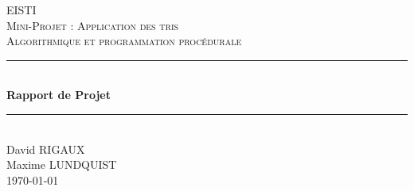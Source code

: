 \documentclass[12pt]{article}
\begin{document}
\lstset{language=Pascal} 
\begin{titlepage}

\newcommand{\HRule}{\rule{\linewidth}{0.5mm}} %

\center %
 

\textsc{\LARGE EISTI}\\[1.5cm] %
\textsc{\Large Mini-Projet : Application des tris}\\[0.5cm] %
\textsc{\large Algorithmique et programmation procédurale}\\[0.5cm] %


\HRule \\[0.4cm]
{ \huge \bfseries  Rapport de Projet}\\[0.4cm] %
\HRule \\[1cm]
 

\Large
David \textsc{RIGAUX}\\[0.5cm]
Maxime \textsc{LUNDQUIST}\\[1cm]


{\large \today}\\[1cm] %



\end{titlepage}
\end{document}
